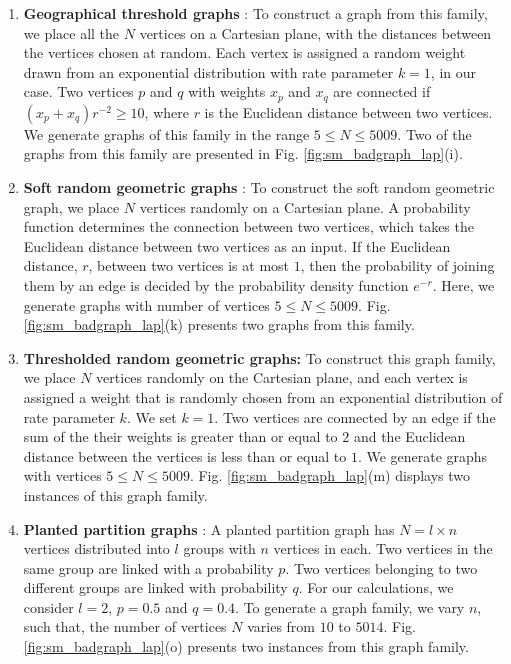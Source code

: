 \documentclass[%
 reprint,
 superscriptaddress,
 amsmath,amssymb,
 aps,
 pra,
floatfix,
nofootinbib,
]{revtex4-2}
\theoremstyle{definition}
\theoremstyle{remark}
\begin{document}
\begin{appendix}
\begin{enumerate}
		\item 
        \textbf{Geographical threshold graphs} 
        \cite{masuda2005geographical, bradonjic2007giant}: To construct a graph from this family, we place all the $N$ vertices on a Cartesian plane, with the distances between the vertices chosen at random. Each vertex is assigned a random weight drawn from an exponential distribution with rate parameter $k = 1$, in our case. Two vertices $p$ and $q$ with weights $x_p$ and $x_q$ are connected if $(x_p+x_q)r^{-2} \ge 10$, where $r$ is the Euclidean distance between two vertices. We generate graphs of this family in the range $5 \leq N \leq 5009$. Two of the graphs from this family are presented in Fig. \ref{fig:sm_badgraph_lap}(i).
		
		\item 
        \textbf{Soft random geometric graphs} 
        \cite{penrose2016connectivity}: To construct the soft random geometric graph, we place $N$ vertices randomly on a Cartesian plane. A probability function determines the connection between two vertices, which takes the Euclidean distance between two vertices as an input. If the Euclidean distance, $r$, between two vertices is at most $1$, then the probability of joining them by an edge is decided by the probability density function $e^{-r}$. Here, we generate graphs with number of vertices $5 \leq N \leq 5009$. Fig. \ref{fig:sm_badgraph_lap}(k) presents two graphs from this family.

        \item 
        \textbf{Thresholded random geometric graphs:} To construct this graph family, we place $N$ vertices randomly on the Cartesian plane, and each vertex is assigned a weight that is randomly chosen from an exponential distribution of rate parameter $k$. We set $k = 1$. Two vertices are connected by an edge if the sum of the their weights is greater than or equal to $2$ and the Euclidean distance between the vertices is less than or equal to $1$. We generate graphs with vertices $5 \leq N \leq 5009$. Fig. \ref{fig:sm_badgraph_lap}(m) displays two instances of this graph family. 
        
		\item 
        \textbf{Planted partition graphs} \cite{condon2001algorithms}: A planted partition graph has $N = l \times n$ vertices distributed into $l$ groups with $n$ vertices in each. Two vertices in the same group are linked with a probability $p$. Two vertices belonging to two different groups are linked with probability $q$. For our calculations, we consider $l = 2$, $p = 0.5$ and $q = 0.4$. To generate a graph family, we vary $n$, such that, the number of vertices $N$ varies from $10$ to $5014$. Fig. \ref{fig:sm_badgraph_lap}(o) presents two instances from this graph family.
        

\end{enumerate}
\end{appendix}
\end{document}

